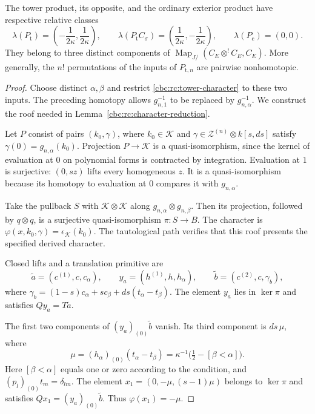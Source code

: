 \begin{theorem}\label{cbc:rc:ordered-product-class}
The tower product, its opposite, and the ordinary exterior
product have respective relative classes
\[
 \lambda(P_{\mathrm t})=
  \left(-\frac1{2\kappa},\frac1{2\kappa}\right),\qquad
 \lambda(P_{\mathrm t}C_\sigma)=
  \left(\frac1{2\kappa},-\frac1{2\kappa}\right),\qquad
 \lambda(P_{\mathrm c})=(0,0).
\]
They belong to three distinct components of
$\operatorname{Map}_{J/}(C_E\otimes^!C_E,C_E)$.
More generally, the $n!$ permutations of the inputs
of $P_{\mathrm t,n}$ are pairwise nonhomotopic.
\end{theorem}
\begin{proof}
Choose distinct $\alpha,\beta$ and restrict
\eqref{cbc:rc:tower-character} to these two inputs.
The preceding homotopy allows $g_{n,1}^{-1}$ to be
replaced by $g_{n,\alpha}^{-1}$.
We construct the roof needed in
Lemma~\ref{cbc:rc:character-reduction}.

Let $P$ consist of pairs $(k_0,\gamma)$, where
$k_0\in\mathcal K$ and
$\gamma\in\mathcal Z^{(n)}\otimes k[s,ds]$ satisfy
$\gamma(0)=g_{n,\alpha}(k_0)$.
Projection $P\to\mathcal K$ is a quasi-isomorphism,
since the kernel of evaluation at $0$ on polynomial
forms is contracted by integration. Evaluation at $1$
is surjective: $(0,sz)$ lifts every homogeneous $z$.
It is a quasi-isomorphism because its homotopy to
evaluation at $0$ compares it with $g_{n,\alpha}$.

Take the pullback $S$ with $\mathcal K\otimes\mathcal K$
along $g_{n,\alpha}\otimes g_{n,\beta}$.
Then its projection, followed by $q\otimes q$, is a
surjective quasi-isomorphism $\pi:S\to B$.
The character is $\varphi(x,k_0,\gamma)=\epsilon_{\mathcal K}(k_0)$.
The tautological path verifies that this roof presents
the specified derived character.

Closed lifts and a translation primitive are
\[
 \tilde a=(c^{(1)},c,c_\alpha),\qquad
 y_a=(h^{(1)},h,h_\alpha),\qquad
 \tilde b=(c^{(2)},c,\gamma_b),
\]
where
$\gamma_b=(1-s)c_\alpha+sc_\beta+ds(t_\alpha-t_\beta)$.
The element $y_a$ lies in $\ker\pi$ and satisfies
$Qy_a=T\tilde a$.

The first two components of $(y_a)_{(0)}\tilde b$ vanish.
Its third component is $ds\,\mu$, where
\[
 \mu=(h_\alpha)_{(0)}(t_\alpha-t_\beta)
   =\kappa^{-1}\bigl(\tfrac12-[\beta<\alpha]\bigr).
\]
Here $[\beta<\alpha]$ equals one or zero according
to the condition, and $(p_l)_{(0)}t_m=\delta_{lm}$.
The element $x_1=(0,-\mu,(s-1)\mu)$ belongs to
$\ker\pi$ and satisfies
$Qx_1=(y_a)_{(0)}\tilde b$.
Thus $\varphi(x_1)=-\mu$.


\end{proof}
